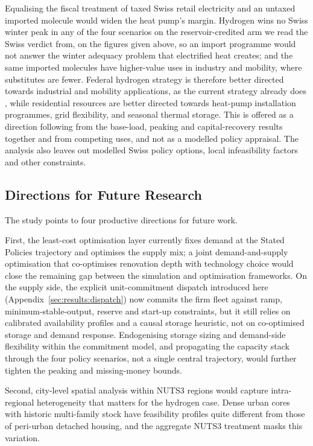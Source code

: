 Equalising the fiscal treatment of taxed Swiss retail electricity and an untaxed
imported molecule would widen the heat pump's margin. Hydrogen wins no Swiss winter
peak in any of the four scenarios on the reservoir-credited arm we read the Swiss
verdict from, on the figures given
above, so an import programme would not answer the winter adequacy problem that
electrified heat creates; and the same imported molecules
have higher-value uses in industry and mobility, where substitutes are fewer. Federal hydrogen strategy is therefore better directed towards industrial and mobility
applications, as the current strategy already does \citep{SFOE2023hydrogen}, while
residential resources are better directed towards heat-pump installation programmes,
grid flexibility, and seasonal thermal storage. This is offered as a direction following
from the base-load, peaking and capital-recovery results together and from competing
uses, and not as a modelled policy appraisal. The analysis also leaves out modelled
Swiss policy options, local infeasibility factors and other constraints.

\subsection{Directions for Future Research}

The study points to four productive directions for future work.

First, the least-cost optimisation layer currently fixes demand at the Stated
Policies trajectory and optimises the supply mix; a joint demand-and-supply
optimisation that co-optimises renovation depth with technology choice would close
the remaining gap between the simulation and optimisation frameworks. On the
supply side, the explicit unit-commitment dispatch introduced here
(Appendix~\ref{sec:results:dispatch}) now commits the firm fleet against ramp,
minimum-stable-output, reserve and start-up constraints, but it still relies on
calibrated availability profiles and a causal storage heuristic, not on
co-optimised storage and demand response. Endogenising storage sizing and
demand-side flexibility within the commitment model, and propagating the
capacity stack through the four policy scenarios, not a single central
trajectory, would further tighten the peaking and missing-money bounds.

Second, city-level spatial analysis within NUTS3 regions would capture
intra-regional heterogeneity that matters for the hydrogen case. Dense urban
cores with historic multi-family stock have feasibility profiles quite different
from those of peri-urban detached housing, and the aggregate NUTS3 treatment
masks this variation.

